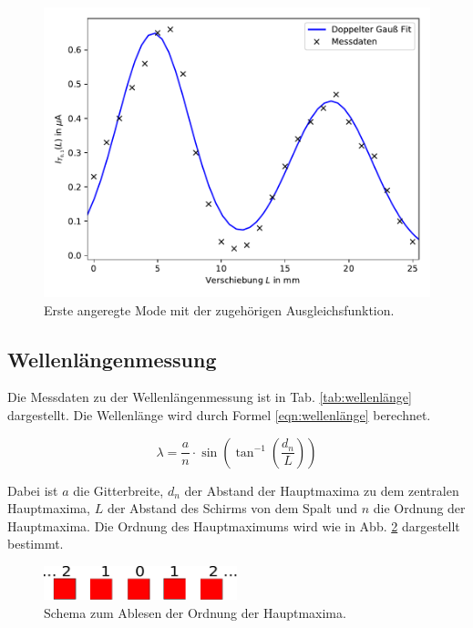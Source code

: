 \begin{figure}[h]
  \centering
  \includegraphics[width = \textwidth]{Pics/erste_angeregte_Mode.pdf}
  \caption{Erste angeregte Mode mit der zugehörigen Ausgleichsfunktion.}
  \label{fig:moden}
\end{figure}

\FloatBarrier

\subsection{Wellenlängenmessung}
\label{sec:wellenlänge}

Die Messdaten zu der Wellenlängenmessung ist in Tab. \ref{tab:wellenlänge}
dargestellt.
Die Wellenlänge wird durch Formel \eqref{eqn:wellenlänge} berechnet.

\begin{equation}
  \label{eqn:wellenlänge}
  \lambda = \frac{a}{n}\cdot\sin\left(\tan^{-1}\left(\frac{d_n}{L}\right)\right)
\end{equation}

Dabei ist $a$ die Gitterbreite, $d_n$ der Abstand der Hauptmaxima zu dem zentralen
Hauptmaxima, $L$ der Abstand des Schirms von dem Spalt und $n$ die Ordnung der
Hauptmaxima. Die Ordnung des Hauptmaximums wird wie in Abb. \ref{fig:ordnung}
dargestellt bestimmt.

\begin{figure}[h]
  \centering
  \includegraphics[width = 0.5\textwidth]{Pics/Ordnung.pdf}
  \caption{Schema zum Ablesen der Ordnung der Hauptmaxima.}
  \label{fig:ordnung}
\end{figure}

